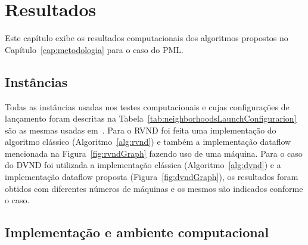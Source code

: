 \chapter{Resultados} \label{cap:resultados}

Este capítulo exibe os resultados computacionais dos algoritmos propostos no Capítulo~\ref{cap:metodologia} para o caso do PML.

\section{Instâncias} \label{sec:instancias}




Todas as instâncias usadas nos testes computacionais e cujas configurações de lançamento foram descritas na Tabela~\ref{tab:neighborhoodsLaunchConfigurarion} são as mesmas usadas em~\cite{wamca2016}.
Para o RVND foi feita uma implementação do algoritmo clássico (Algoritmo~\ref{alg:rvnd}) e também a implementação dataflow mencionada na Figura~\ref{fig:rvndGraph} fazendo uso de uma máquina.
Para o caso do DVND foi utilizada a implementação clássica (Algoritmo~\ref{alg:dvnd}) e a implementação dataflow proposta (Figura~\ref{fig:dvndGraph}), os resultados foram obtidos com diferentes números de máquinas e os mesmos são indicados conforme o caso.

\section{Implementação e ambiente computacional}\label{sec:amb}

